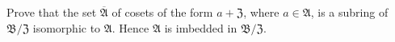 Prove that the set $\overline{\mathfrak{A}}$ of cosets of the form $a + \mathfrak{Z}$, where $a \in \mathfrak{A}$, is a subring of $\mathfrak{B}/\mathfrak{Z}$ isomorphic to $\mathfrak{A}$. Hence $\mathfrak{A}$ is imbedded in $\mathfrak{B}/\mathfrak{Z}$.
